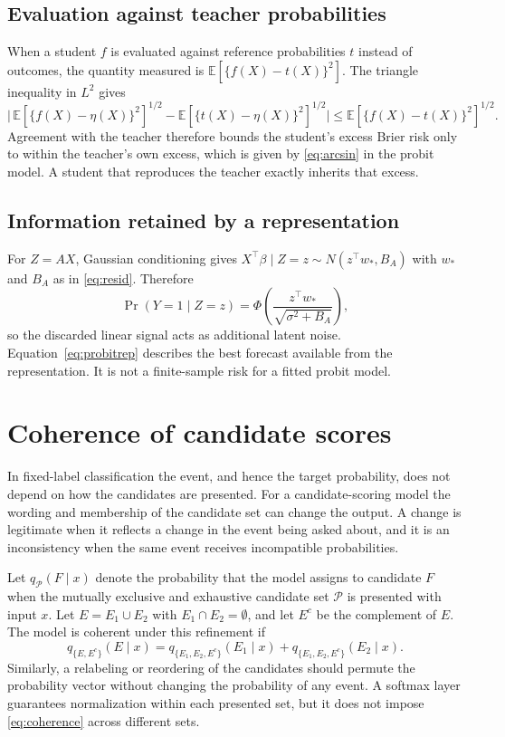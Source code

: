\documentclass[11pt]{article}
\theoremstyle{remark}
\newcommand{\E}{\mathbb E}
\newcommand{\1}{\mathbf 1}
\begin{document}
\subsection{Evaluation against teacher probabilities}
When a student $f$ is evaluated against reference probabilities $t$ instead of outcomes, the quantity measured is $\E[\{f(X)-t(X)\}^2]$. The triangle inequality in $L^2$ gives
\begin{equation}\label{eq:triangle}
\Big|\,\E[\{f(X)-\eta(X)\}^2]^{1/2}-\E[\{t(X)-\eta(X)\}^2]^{1/2}\Big|\le\E[\{f(X)-t(X)\}^2]^{1/2}.
\end{equation}
Agreement with the teacher therefore bounds the student's excess Brier risk only to within the teacher's own excess, which is given by \eqref{eq:arcsin} in the probit model. A student that reproduces the teacher exactly inherits that excess.

\subsection{Information retained by a representation}
For $Z=AX$, Gaussian conditioning gives $X^\top\beta\mid Z=z\sim N(z^\top w_*,B_A)$ with $w_*$ and $B_A$ as in \eqref{eq:resid}. Therefore
\begin{equation}\label{eq:probitrep}
\Pr(Y=1\mid Z=z)=\Phi\left(\frac{z^\top w_*}{\sqrt{\sigma^2+B_A}}\right),
\end{equation}
so the discarded linear signal acts as additional latent noise. Equation~\eqref{eq:probitrep} describes the best forecast available from the representation. It is not a finite-sample risk for a fitted probit model.

\section{Coherence of candidate scores}\label{sec:coherence}
In fixed-label classification the event, and hence the target probability, does not depend on how the candidates are presented. For a candidate-scoring model the wording and membership of the candidate set can change the output. A change is legitimate when it reflects a change in the event being asked about, and it is an inconsistency when the same event receives incompatible probabilities.

Let $q_{\mathcal P}(F\mid x)$ denote the probability that the model assigns to candidate $F$ when the mutually exclusive and exhaustive candidate set $\mathcal P$ is presented with input $x$. Let $E=E_1\cup E_2$ with $E_1\cap E_2=\emptyset$, and let $E^c$ be the complement of $E$. The model is coherent under this refinement if
\begin{equation}\label{eq:coherence}
q_{\{E,E^c\}}(E\mid x)=q_{\{E_1,E_2,E^c\}}(E_1\mid x)+q_{\{E_1,E_2,E^c\}}(E_2\mid x).
\end{equation}
Similarly, a relabeling or reordering of the candidates should permute the probability vector without changing the probability of any event. A softmax layer guarantees normalization within each presented set, but it does not impose \eqref{eq:coherence} across different sets.
\end{document}
